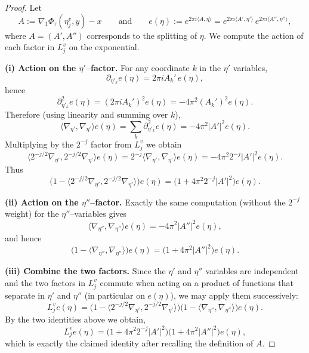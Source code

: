 \documentclass[10pt,a4paper]{amsart}
\begin{document}
\begin{proof}
Let
\[
A:=\nabla_1\Phi_\tau(\eta_j^v,y)-x
\qquad\text{and}\qquad
e(\eta):=e^{2\pi i\langle A,\eta\rangle}
= e^{2\pi i\langle A',\eta'\rangle}\,e^{2\pi i\langle A'',\eta''\rangle},
\]
where $A=(A',A'')$ corresponds to the splitting of $\eta$. We compute the action of each factor in $L_j^v$ on the exponential.

\medskip\noindent\textbf{(i) Action on the $\eta'$--factor.}
For any coordinate $k$ in the $\eta'$ variables,
\[
\partial_{\eta'_k} e(\eta) = 2\pi i A_k' \, e(\eta),
\]
hence
\[
\partial_{\eta'_k}^2 e(\eta) = (2\pi i A_k')^2 e(\eta) = -4\pi^2 (A_k')^2 e(\eta).
\]
Therefore (using linearity and summing over $k$),
\[
\langle \nabla_{\eta'},\nabla_{\eta'}\rangle e(\eta)
= \sum_{k} \partial_{\eta'_k}^2 e(\eta)
= -4\pi^2 |A'|^2 e(\eta).
\]
Multiplying by the $2^{-j}$ factor from $L_j^v$ we obtain
\[
\langle 2^{-j/2}\nabla_{\eta'},2^{-j/2}\nabla_{\eta'}\rangle e(\eta)
= 2^{-j} \langle \nabla_{\eta'},\nabla_{\eta'}\rangle e(\eta)
= -4\pi^2 2^{-j} |A'|^2 e(\eta).
\]
Thus
\[
\big(1 - \langle 2^{-j/2}\nabla_{\eta'},2^{-j/2}\nabla_{\eta'}\rangle\big) e(\eta)
= \big(1 + 4\pi^2 2^{-j} |A'|^2\big) e(\eta).
\]

\medskip\noindent\textbf{(ii) Action on the $\eta''$--factor.}
Exactly the same computation (without the $2^{-j}$ weight) for the $\eta''$--variables gives
\[
\langle \nabla_{\eta''},\nabla_{\eta''}\rangle e(\eta)
= -4\pi^2 |A''|^2 e(\eta),
\]
and hence
\[
\big(1 - \langle \nabla_{\eta''},\nabla_{\eta''}\rangle\big) e(\eta)
= \big(1 + 4\pi^2 |A''|^2\big) e(\eta).
\]

\medskip\noindent\textbf{(iii) Combine the two factors.}
Since the $\eta'$ and $\eta''$ variables are independent and the two factors
in $L_j^v$ commute when acting on a product of functions that separate in
$\eta'$ and $\eta''$ (in particular on $e(\eta)$), we may apply them successively:
\[
L_j^v e(\eta)
= \big(1 - \langle 2^{-j/2}\nabla_{\eta'},2^{-j/2}\nabla_{\eta'}\rangle\big)
  \big(1 - \langle \nabla_{\eta''},\nabla_{\eta''}\rangle\big)
  e(\eta).
\]
By the two identities above we obtain,
\[ L_j^v e(\eta)=
\big(1 + 4\pi^2 2^{-j} |A'|^2\big)\big(1 + 4\pi^2 |A''|^2\big) e(\eta),
\]
which is exactly the claimed identity after recalling the definition of $A$.
\end{proof}
\end{document}
